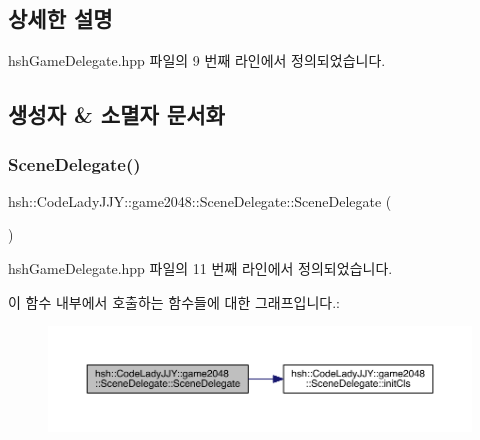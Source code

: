 \subsection{상세한 설명}


hsh\+Game\+Delegate.\+hpp 파일의 9 번째 라인에서 정의되었습니다.



\subsection{생성자 \& 소멸자 문서화}
\mbox{\label{classhsh_1_1_code_lady_j_j_y_1_1game2048_1_1_scene_delegate_afa15a8d40890d55355083d2edfe001e0}} 
\subsubsection{\texorpdfstring{Scene\+Delegate()}{SceneDelegate()}}
{\footnotesize\ttfamily hsh\+::\+Code\+Lady\+J\+J\+Y\+::game2048\+::\+Scene\+Delegate\+::\+Scene\+Delegate (\begin{DoxyParamCaption}{ }\end{DoxyParamCaption})\hspace{0.3cm}{\ttfamily [inline]}}



hsh\+Game\+Delegate.\+hpp 파일의 11 번째 라인에서 정의되었습니다.

이 함수 내부에서 호출하는 함수들에 대한 그래프입니다.\+:
\nopagebreak
\begin{figure}[H]
\begin{center}
\leavevmode
\includegraphics[width=350pt]{classhsh_1_1_code_lady_j_j_y_1_1game2048_1_1_scene_delegate_afa15a8d40890d55355083d2edfe001e0_cgraph}
\end{center}
\end{figure}


